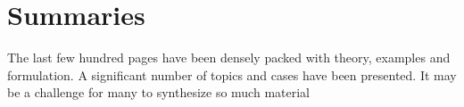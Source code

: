 \chapter{Summaries}

The last few hundred pages have been densely packed with theory, examples and formulation. A significant number of topics and cases have been presented. It may be a challenge for many to synthesize so much material




\endinput